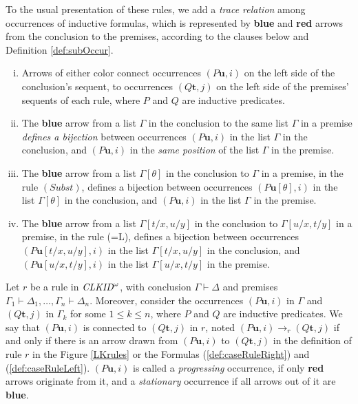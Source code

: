 To the usual presentation of these rules, we add a \emph{trace relation} among occurrences of inductive formulas, which is represented by {\color{blue} \bf blue} and {\color{red} \bf red} arrows from the conclusion to the premises, according to the clauses below and Definition \ref{def:subOccur}. 


\begin{enumerate}[i)]
    \item Arrows of either color connect occurrences $(P\mathbf{u}, i)$ on the left side of the conclusion's sequent, to occurrences $(Q\mathbf{t}, j)$ on the left side of the premises' sequents of each rule, where $P$ and $Q$ are inductive predicates.
    \item The {\color{blue} \bf blue} arrow from a list $\Gamma$ in the conclusion to the same list $\Gamma$ in a premise \emph{defines a bijection} between occurrences $(P\mathbf{u},i)$ in the list $\Gamma$ in the conclusion, and $(P\mathbf{u},i)$ in the \emph{same position} of the list $\Gamma$ in the premise.
    \item The {\color{blue} \bf blue} arrow from a list $\Gamma[\theta]$ in the conclusion to $\Gamma$ in a premise, in the rule $(Subst)$, defines a bijection between occurrences $(P\mathbf{u}[\theta],i)$ in the list $\Gamma[\theta]$ in the conclusion, and $(P\mathbf{u},i)$ in the list $\Gamma$ in the premise.
    \item The {\color{blue} \bf blue} arrow from a list $\Gamma[t/x,u/y]$ in the conclusion to $\Gamma[u/x,t/y]$ in a premise, in the rule (=L), defines a bijection between occurrences $(P\mathbf{u}[t/x,u/y],i)$ in the list $\Gamma[t/x,u/y]$ in the conclusion, and $(P\mathbf{u}[u/x,t/y],i)$ in the list $\Gamma[u/x,t/y]$ in the premise.   
\end{enumerate}


\begin{definition}
    \label{def:subOccur}
    Let $r$ be a rule in $\textit{CLKID}^\omega$, with conclusion $\Gamma \vdash \Delta$ and premises $\Gamma_1 \vdash \Delta_1, \ldots, \Gamma_n \vdash \Delta_n$. Moreover, consider the occurrences $(P\mathbf{u},i)$ in $\Gamma$ and $(Q\mathbf{t},j)$ in $\Gamma_k$ for some $ 1 \leq k \leq n$, where $P$ and $Q$ are inductive predicates. We say that $(P\mathbf{u},i)$ is connected to $(Q\mathbf{t},j)$ in $r$, noted $(P\mathbf{u},i) \rightarrow_{r} (Q\mathbf{t},j)$ if and only if there is an arrow drawn from $(P\mathbf{u},i)$ to $(Q\mathbf{t},j)$ in the definition of rule $r$ in the Figure \ref{LKrules} or the Formulas (\ref{def:caseRuleRight}) and (\ref{def:caseRuleLeft}). $(P\mathbf{u},i)$ is called a \emph{progressing} occurrence, if only {\color{red} \bf red} arrows originate from it, and a \emph{stationary} occurrence if all arrows out of it are {\color{blue} \bf blue}.
\end{definition}

